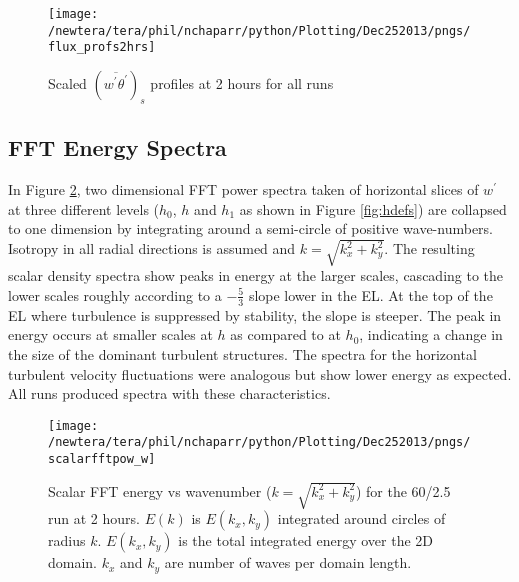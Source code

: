 \begin{figure}[htbp]
    \centering
    \texttt{[image: /newtera/tera/phil/nchaparr/python/Plotting/Dec252013/pngs/flux\_profs2hrs]}
    \caption{Scaled $(\overline{w^{'}\theta^{'}})_{s}$ profiles at 2 hours for all runs}
    \label{fig:fluxprofs2hrs}   %
\end{figure}

\clearpage

\subsection{FFT Energy Spectra}
\FloatBarrier

In Figure \ref{fig:scalarfftw602point5}, two dimensional \acs{FFT} power spectra taken of horizontal slices of $w^{\prime}$ at three different levels ($h_{0}$, $h$ and $h_{1}$ as shown in Figure \ref{fig:hdefs}) are collapsed to one dimension by integrating around a semi-circle of positive wave-numbers.
Isotropy in all radial directions is assumed and $k = \sqrt{k_{x}^{2} + k_{y}^{2}}$.  The resulting scalar density spectra show peaks in energy at the larger scales, cascading to the lower scales roughly according to a $-\frac{5}{3}$ slope lower in the \acs{EL}.  At
the top of the \acs{EL} where turbulence is suppressed by stability, the slope is steeper.  The peak in energy occurs at smaller scales
at $h$ as compared to at $h_{0}$, indicating a change in the size of the dominant turbulent structures. The spectra for the horizontal
turbulent velocity fluctuations were analogous but show lower energy as expected.  All runs produced spectra with these characteristics.\\

\begin{figure}[htbp]
    \centering
    \texttt{[image: /newtera/tera/phil/nchaparr/python/Plotting/Dec252013/pngs/scalarfftpow\_w]}
    \caption[\acs{FFT} energy spectra of $w^{'}$]{Scalar FFT  energy vs wavenumber ($k = \sqrt{k_{x}^{2}+k_{y}^{2}}$) for the 60/2.5 run
at 2 hours.  $E(k)$ is $E(k_{x}, k_{y})$ integrated around circles of radius $k$.  
   $E(k_{x}, k_{y})$ is the total integrated energy over the 2D domain.  
   $k_{x}$ and $k_{y}$ are number of waves per domain length.}
   \label{fig:scalarfftw602point5}   %
\end{figure}


